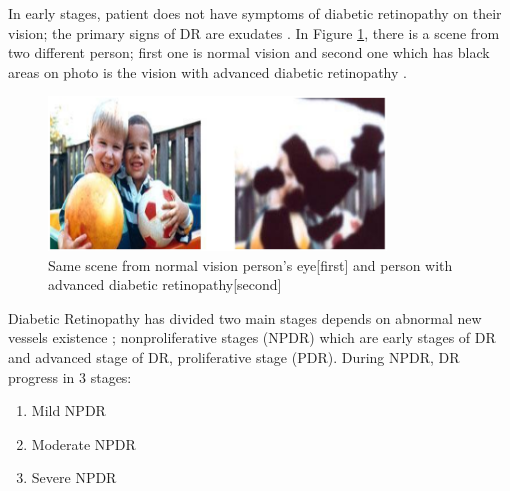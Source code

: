 In early stages, patient does not have symptoms of diabetic retinopathy on their vision; the primary signs of DR are exudates \citep{nijalingappa2015machine}. In Figure \ref{visionOfDrAndNodr}, there is a scene from two different person; first one is normal vision and second one which has black areas on photo is the vision with advanced diabetic retinopathy \citep{NationalEyeInstitute}. 

\begin{figure}[t]
\centering
\includegraphics[width=0.8\textwidth]{Figures/vision_of_dr_and_nodr}
\caption{Same scene from normal vision person's eye[first] and person with advanced diabetic retinopathy[second]}
\label{visionOfDrAndNodr}
\end{figure}

Diabetic Retinopathy has divided two main stages depends on abnormal new vessels existence  \citep{tang2011inflammation, nijalingappa2015machine}; nonproliferative stages (NPDR) which are early stages of DR and advanced stage of DR, proliferative stage (PDR). 
During NPDR, DR progress in 3 stages:

    \begin{enumerate}
        \item Mild NPDR
        \item Moderate NPDR
        \item Severe NPDR
    \end{enumerate}


